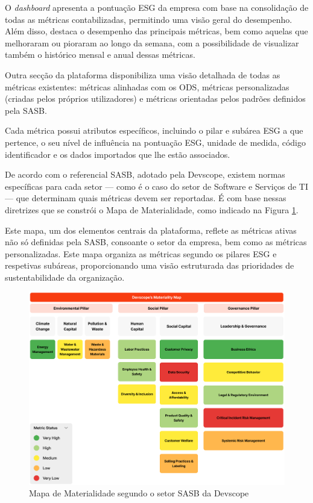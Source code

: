 O \textit{dashboard} apresenta a pontuação ESG da empresa com base na consolidação de todas as métricas contabilizadas, permitindo uma visão geral do desempenho. Além disso, destaca o desempenho das principais métricas, bem como aquelas que melhoraram ou pioraram ao longo da semana, com a possibilidade de visualizar também o histórico mensal e anual dessas métricas.

Outra secção da plataforma disponibiliza uma visão detalhada de todas as métricas existentes: métricas alinhadas com os \gls{ODS}, métricas personalizadas (criadas pelos próprios utilizadores) e métricas orientadas pelos padrões definidos pela \gls{SASB}.

Cada métrica possui atributos específicos, incluindo o pilar e subárea ESG a que pertence, o seu nível de influência na pontuação ESG, unidade de medida, código identificador e os dados importados que lhe estão associados.

De acordo com o referencial \gls{SASB}, adotado pela Devscope, existem normas específicas para cada setor — como é o caso do setor de Software e Serviços de TI — que determinam quais métricas devem ser reportadas. É com base nessas diretrizes que se constrói o Mapa de Materialidade, como indicado na Figura \ref{fig:materiality_map}.

Este mapa, um dos elementos centrais da plataforma, reflete as métricas ativas não só definidas pela \gls{SASB}, consoante o setor da empresa, bem como as métricas personalizadas. Este mapa organiza as métricas segundo os pilares ESG e respetivas subáreas, proporcionando uma visão estruturada das prioridades de sustentabilidade da organização.

\begin{figure}[h]
    \centering
    \includegraphics[width=\linewidth]{frontmatter/assets/mapa-materialidade.png}
    \caption{Mapa de Materialidade segundo o setor SASB da Devscope}
    \label{fig:materiality_map}
\end{figure}

